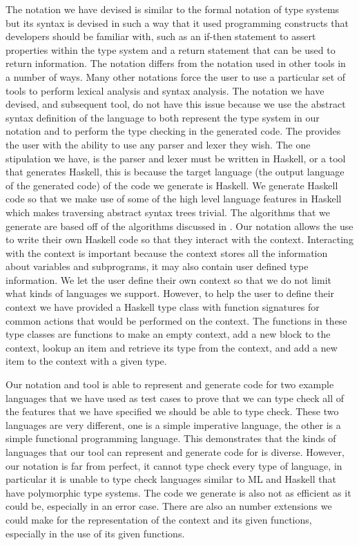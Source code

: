 \documentclass{UoYCSproject}
\begin{document}
\begin{summary}
    The notation we have devised is similar to the formal notation of type systems but its syntax is devised in such a way that it used programming constructs that developers should be familiar with, such as an if-then statement to assert properties within the type system and a return statement that can be used to return information.
    The notation differs from the notation used in other tools in a number of ways.
    Many other notations force the user to use a particular set of tools to perform lexical analysis and syntax analysis.
    The notation we have devised, and subsequent tool, do not have this issue because we use the abstract syntax definition of the language to both represent the type system in our notation and to perform the type checking in the generated code.
    The provides the user with the ability to use any parser and lexer they wish.
    The one stipulation we have, is the parser and lexer must be written in Haskell, or a tool that generates Haskell, this is because the target language (the output language of the generated code) of the code we generate is Haskell.
    We generate Haskell code so that we make use of some of the high level language features in Haskell which makes traversing abstract syntax trees trivial.
    The algorithms that we generate are based off of the algorithms discussed in \textcite{ranta2012implementing}.
    Our notation allows the use to write their own Haskell code so that they interact with the context.
    Interacting with the context is important because the context stores all the information about variables and subprograms, it may also contain user defined type information.
    We let the user define their own context so that we do not limit what kinds of languages we support.
    However, to help the user to define their context we have provided a Haskell type class with function signatures for common actions that would be performed on the context.
    The functions in these type classes are functions to make an empty context, add a new block to the context, lookup an item and retrieve its type from the context, and add a new item to the context with a given type.

    Our notation and tool is able to represent and generate code for two example languages that we have used as test cases to prove that we can type check all of the features that we have specified we should be able to type check.
    These two languages are very different, one is a simple imperative language, the other is a simple functional programming language.
    This demonstrates that the kinds of languages that our tool can represent and generate code for is diverse.
    However, our notation is far from perfect, it cannot type check every type of language, in particular it is unable to type check languages similar to ML and Haskell that have polymorphic type systems.
    The code we generate is also not as efficient as it could be, especially in an error case.
    There are also an number extensions we could make for the representation of the context and its given functions, especially in the use of its given functions.


\end{summary}
\end{document}
